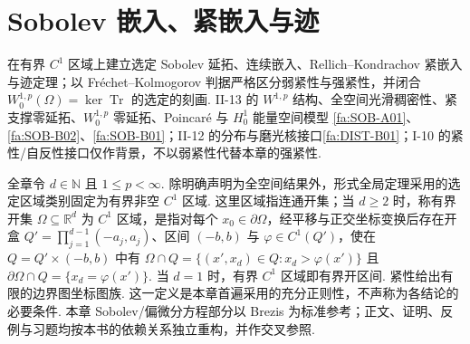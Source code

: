 \chapter{Sobolev 嵌入、紧嵌入与迹}\label{chap:II-14}
\FAChapterOpening
{在有界 \(\displaystyle C^1\) 区域上建立选定 Sobolev 延拓、连续嵌入、Rellich--Kondrachov 紧嵌入与迹定理；以 Fréchet--Kolmogorov 判据严格区分弱紧性与强紧性，并闭合 \(\displaystyle W_0^{1,p}(\Omega)=\ker\operatorname{Tr}\) 的选定的刻画.}
{II-13 的 \(\displaystyle W^{1,p}\) 结构、全空间光滑稠密性、紧支撑零延拓、\(\displaystyle W_0^{1,p}\) 零延拓、Poincaré 与 \(\displaystyle H_0^1\) 能量空间模型 \autoref{fa:SOB-A01}、\autoref{fa:SOB-B02}、\autoref{fa:SOB-B01}；II-12 的分布与磨光核接口\autoref{fa:DIST-B01}；I-10 的紧性/自反性接口仅作背景，不以弱紧性代替本章的强紧性.}
{\begin{center}
\end{center}}

全章令 \(\displaystyle d\in\mathbb N\) 且 \(\displaystyle1\leqslant p<\infty\). 除明确声明为全空间结果外，形式全局定理采用的选定区域类别固定为有界非空 \(\displaystyle C^1\) 区域. 这里区域指连通开集；当 \(\displaystyle d\geqslant2\) 时，称有界开集 \(\displaystyle\Omega\subseteq\mathbb R^d\) 为 \(\displaystyle C^1\) 区域，是指对每个 \(\displaystyle x_0\in\partial\Omega\)，经平移与正交坐标变换后存在开盒 \(\displaystyle Q'=\prod_{j=1}^{d-1}(-a_j,a_j)\)、区间 \(\displaystyle(-b,b)\) 与 \(\displaystyle\varphi\in C^1(Q')\)，使在 \(\displaystyle Q=Q'\times(-b,b)\) 中有 \(\displaystyle\Omega\cap Q=\{(x',x_d)\in Q:x_d>\varphi(x')\}\) 且 \(\displaystyle\partial\Omega\cap Q=\{x_d=\varphi(x')\}\). 当 \(\displaystyle d=1\) 时，有界 \(\displaystyle C^1\) 区域即有界开区间. 紧性给出有限的边界图坐标图族. 这一定义是本章首遍采用的充分正则性，不声称为各结论的必要条件. 本章 Sobolev/偏微分方程部分以 Brezis 为标准参考；正文、证明、反例与习题均按本书的依赖关系独立重构，并作交叉参照\cite{brezis2011}.

